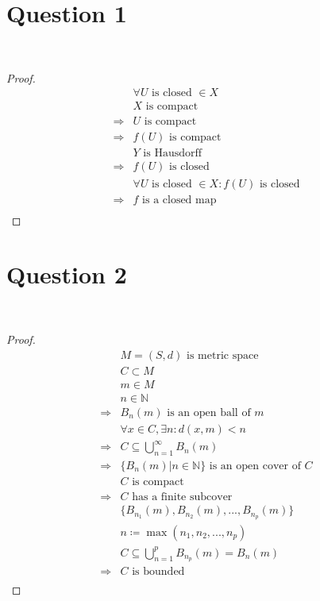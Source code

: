 \documentclass{article}
\begin{document}
\section*{Question 1}

~

\begin{proof}
    \begin{align*}
        &\forall U\text{ is closed }\in X\\
        &X\text{ is compact}\\
        \Rightarrow&U\text{ is compact}\\
        \Rightarrow&f(U)\text{ is compact}\\
        &Y\text{ is Hausdorff}\\
        \Rightarrow&f(U)\text{ is closed}\\
        &\forall U\text{ is closed }\in X:f(U)\text{ is closed}\\
        \Rightarrow&f\text{ is a closed map}\\
    \end{align*}
\end{proof}

\newpage

\section*{Question 2}

~

\begin{proof}
    \begin{align*}
        &M=(S,d)\text{ is metric space}\\
        &C\subset M\\
        &m\in M\\
        &n\in \mathbb{N} \\
        \Rightarrow&B_n(m)\text{ is an open ball of }m\\
        &\forall x\in C,\exists n:d(x,m)<n \\
        \Rightarrow&C\subseteq \bigcup_{n=1}^{\infty}B_n(m)\\
        \Rightarrow&\{B_n(m)|n\in\mathbb{N} \}\text{ is an open cover of }C\\
        &C\text{ is compact}\\
        \Rightarrow&C\text{ has a finite subcover}\\
        &\{B_{n_1}(m),B_{n_2}(m),...,B_{n_p}(m)\}\\
        &n\coloneqq \max(n_1,n_2,...,n_p)\\
        &C\subseteq\bigcup_{n=1}^{p}B_{n_p}(m)=B_n(m)\\
        \Rightarrow&C\text{ is bounded}\\
    \end{align*}
\end{proof}
\end{document}
